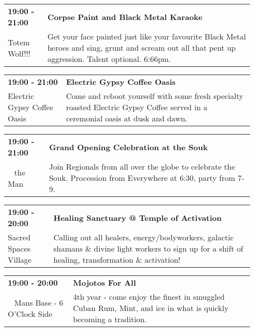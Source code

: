 \begin{tabular}{ p{1in} p{2.2in} }
    \textbf{19:00 - 21:00} & \textbf{Corpse Paint and Black Metal Karaoke} \\
    Totem Wolf!!! \newline  & Get your face painted just like your favourite Black Metal heroes and sing, grunt and scream out all that pent up aggression. Talent optional. 6:66pm. \\
    \hline 
\end{tabular}
    
\begin{tabular}{ p{1in} p{2.2in} }
    \textbf{19:00 - 21:00} & \textbf{Electric Gypsy Coffee Oasis} \\
    Electric Gypsy Coffee Oasis \newline  & Come and reboot yourself with some fresh specialty roasted Electric Gypsy Coffee served in a ceremonial oasis at dusk and dawn. \\
    \hline 
\end{tabular}
    
\begin{tabular}{ p{1in} p{2.2in} }
    \textbf{19:00 - 21:00} & \textbf{Grand Opening Celebration at the Souk} \\
    ~ \newline the Man & Join Regionals from all over the globe to celebrate the Souk. Procession from Everywhere at 6:30, party from 7-9. \\
    \hline 
\end{tabular}
    
\begin{tabular}{ p{1in} p{2.2in} }
    \textbf{19:00 - 20:00} & \textbf{Healing Sanctuary @ Temple of Activation} \\
    Sacred Spaces Village \newline  & Calling out all healers, energy/bodyworkers, galactic shamans \& divine light workers to sign up for a shift of healing, transformation \& activation! \\
    \hline 
\end{tabular}
    
\begin{tabular}{ p{1in} p{2.2in} }
    \textbf{19:00 - 20:00} & \textbf{Mojotos For All} \\
    ~ \newline Mans Base - 6 O'Clock Side & 4th year - come enjoy the finest in smuggled Cuban Rum, Mint, and ice in what is quickly becoming a tradition. \\
    \hline 
\end{tabular}
    
